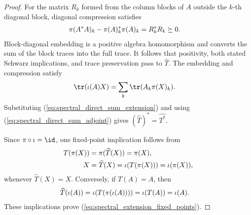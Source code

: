 \begin{proof}
    \leanok
    For the matrix $R_k$ formed from the column blocks of $A$ outside the
    $k$-th diagonal block, diagonal compression satisfies
    \begin{align}
        \pi(A^*A)_k-\pi(A)_k^*\pi(A)_k
        &=R_k^*R_k\succeq0.
        \notag
    \end{align}
    Block-diagonal embedding is a positive algebra homomorphism and converts
    the sum of the block traces into the full trace. It follows that
    positivity, both stated Schwarz implications, and trace preservation
    pass to $\widehat T$. The embedding and compression satisfy
    \begin{align}
        \tr(\iota(A)X)
        &=\sum_k\tr(A_k\pi(X)_k).
        \notag
    \end{align}
    Substituting (\ref{eq:spectral_direct_sum_extension}) and using
    (\ref{eq:spectral_direct_sum_adjoint}) gives
    $(\widehat T)^*=\widehat{T^*}$.

    Since $\pi\circ\iota=\id$, one fixed-point implication follows from
    \begin{align}
        T(\pi(X))
        &=\pi(\widehat T(X))
          =\pi(X), \notag\\
        X
        &=\widehat T(X)
          =\iota(T(\pi(X)))
          =\iota(\pi(X)),
        \notag
    \end{align}
    whenever $\widehat T(X)=X$. Conversely, if $T(A)=A$, then
    \begin{align}
        \widehat T(\iota(A))
        &=\iota(T(\pi(\iota(A))))
          =\iota(T(A))
          =\iota(A).
        \notag
    \end{align}
    These implications prove
    (\ref{eq:spectral_extension_fixed_points}).
\end{proof}
